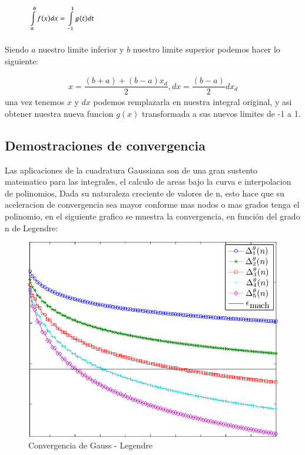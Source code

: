 \documentclass[journal,transmag]{IEEEtran}
\theoremstyle{mytheoremstyle}
\theoremstyle{mytheoremstyle}
\theoremstyle{myproblemstyle}
\begin{document}
            \begin{figure}[h]
                \centering
                \includegraphics[width=3cm]{images/transformacionlimites.PNG}
            \end{figure}
            Siendo $a$ nuestro limite inferior y $b$ nuestro limite superior podemos hacer lo siguiente:
            
            \begin{align*}
               x=\dfrac{(b+a)+(b-a)x_d}{2},dx=\dfrac{(b-a)}{2}dx_d
            \end{align*}
            una vez tenemos $x$ y $dx$ podemos remplazarla en nuestra integral original, y asi obtener nuestra nueva funcion $g(x)$ transformada a sus nuevos limites de -1 a 1.
            
            
            \subsection{Demostraciones de convergencia}
            Las aplicaciones de la cuadratura Gaussiana son de una gran sustento matematico para las integrales, el calculo de areas bajo la curva e interpolacion de polinomios, Dada su naturaleza creciente de valores de n, esto hace que su aceleracion de convergencia sea mayor conforme mas nodos o mas grados tenga el polinomio, en el siguiente grafico se muestra la convergencia, en función del grado n de Legendre:
            
            \begin{figure}[h]
                \centering
                \includegraphics[width=\linewidth]{images/Convergencia_Gauss.png}
                \caption{Convergencia de Gauss - Legendre}
                \label{fig:función del grado n de Legendre}
            \end{figure}
            
\end{document}
